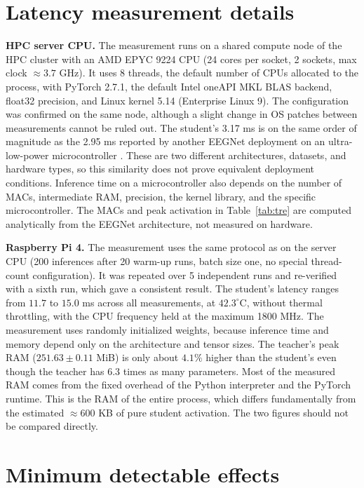 \section{Latency measurement details}
\label{app:dotre}

\textbf{HPC server CPU.} The measurement runs on a shared compute node of the HPC cluster with an
AMD EPYC 9224 CPU (24 cores per socket, 2 sockets, max clock
$\approx 3.7$ GHz). It uses 8 threads, the default number of CPUs allocated
to the process, with PyTorch 2.7.1, the default Intel oneAPI MKL BLAS
backend, float32 precision, and Linux kernel 5.14 (Enterprise Linux 9). The configuration was confirmed on the same node,
although a slight change in OS patches between measurements cannot be
ruled out. The student's 3.17 ms is on the same order of magnitude as the
2.95 ms reported by another EEGNet deployment on an ultra-low-power
microcontroller \cite{wang2024mibminet}. These are two different
architectures, datasets, and hardware types, so this similarity does not
prove equivalent deployment conditions. Inference time on a
microcontroller also depends on the number of MACs, intermediate RAM,
precision, the kernel library, and the specific microcontroller. The MACs
and peak activation in Table~\ref{tab:tre} are computed analytically from
the EEGNet architecture, not measured on hardware.

\textbf{Raspberry Pi 4.} The measurement uses the same protocol as on the server CPU (200
inferences after 20 warm-up runs, batch size one, no special thread-count
configuration). It was repeated over 5 independent runs and re-verified
with a sixth run, which gave a consistent result. The
student's latency ranges from $11.7$ to $15.0$ ms across all
measurements, at $42.3^\circ$C, without thermal throttling, with the CPU
frequency held at the maximum 1800 MHz. The measurement uses randomly
initialized weights, because inference time and memory depend only on
the architecture and tensor sizes. The teacher's peak RAM
($251.63 \pm 0.11$ MiB) is only about $4.1\%$ higher than the student's
even though the teacher has $6.3$ times as many parameters. Most of the
measured RAM comes from the fixed overhead of the Python interpreter and
the PyTorch runtime. This is the RAM of the entire process, which differs fundamentally from
the estimated $\approx 600$ KB of pure student activation. The two figures
should not be compared directly.

\section{Minimum detectable effects}
\label{app:mde}

